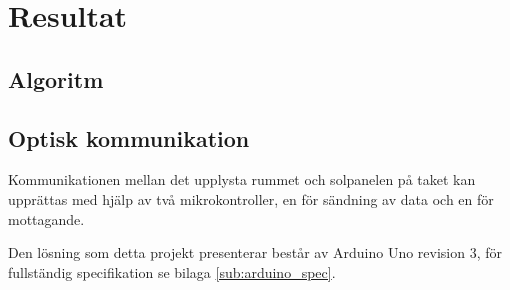 \section{Resultat} %
\label{sec:resultat}
    \subsection{Algoritm} %
    \label{sub:algoritm}

    \subsection{Optisk kommunikation} %
    \label{sub:optisk_kommunikation}

        Kommunikationen mellan det upplysta rummet och solpanelen på taket kan upprättas med hjälp av två mikrokontroller, en för sändning av data och en för mottagande. \bigskip

        Den lösning som detta projekt presenterar består av Arduino Uno revision 3, för fullständig specifikation se bilaga \ref{sub:arduino_spec}.\cite{ardu}
    
